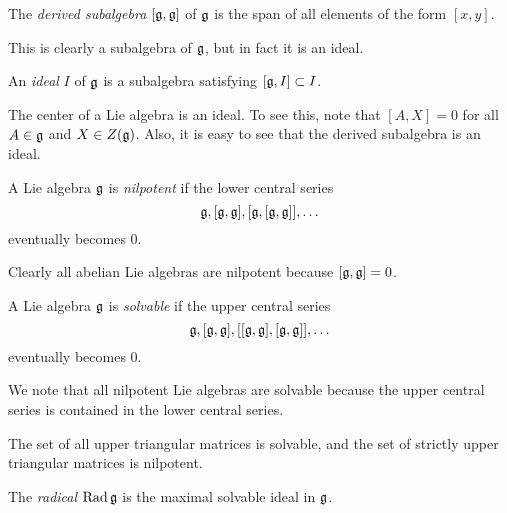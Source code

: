 \documentclass[twoside, 10pt]{article}
\begin{document}
    \begin{defn} The \textit{derived subalgebra} $[\mathfrak{g},\mathfrak{g}]$ of $\mathfrak{g}$
    is the span of all elements of the form $[x,y]$.  \end{defn}

    This is clearly a subalgebra of $\mathfrak{g}$, but in fact it is an ideal.

    \begin{defn} An \textit{ideal} $I$ of $\mathfrak{g}$ is a subalgebra satisfying
    $[\mathfrak{g},I] \subset I$.  \end{defn}

    \begin{exm} The center of a Lie algebra is an ideal. To see this, note that
    $[A,X] = 0$ for all $A \in \mathfrak{g}$ and $X \in Z(\mathfrak{g})$. Also, it is easy
to see that the derived subalgebra is an ideal.  \end{exm}

    \begin{defn} A Lie algebra $\mathfrak{g}$ is \textit{nilpotent} if the lower
        central series \[\mathfrak{g}, [\mathfrak{g}, \mathfrak{g}], [\mathfrak{g}, [\mathfrak{g}, \mathfrak{g}]],
        \ldots \] eventually becomes $0$.  \end{defn}

    \begin{exm} Clearly all abelian Lie algebras are nilpotent because
    $[\mathfrak{g}, \mathfrak{g}] = 0$.  \end{exm}

    \begin{defn} A Lie algebra $\mathfrak{g}$ is \textit{solvable} if the upper
        central series \[\mathfrak{g}, [\mathfrak{g}, \mathfrak{g}], [[\mathfrak{g}, \mathfrak{g}], [\mathfrak{g},
        \mathfrak{g}]], \ldots \] eventually becomes $0$.  \end{defn}

    \begin{exm} We note that all nilpotent Lie algebras are solvable because
    the upper central series is contained in the lower central series.
\end{exm}

    \begin{exm} The set of all upper triangular matrices is solvable, and the
    set of strictly upper triangular matrices is nilpotent.  \end{exm}

    \begin{defn} The \textit{radical} $\operatorname{Rad} \mathfrak{g}$ is the
    maximal solvable ideal in $\mathfrak{g}$.  \end{defn}
\end{document}
